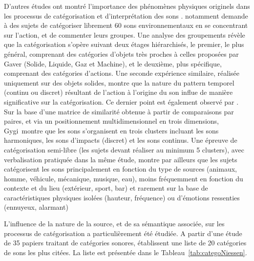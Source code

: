 D'autres études ont montré l'importance des phénomènes physiques originels dans les processus de catégorisation et d'interprétation des sons \citep{marcell2000confrontation,lemaitre2010listener}. \citep{houix_lexical_2012} notamment demande à des sujets de catégoriser librement 60 sons environnementaux en se concentrant sur l'action, et de commenter leurs groupes. Une analyse des groupements révèle que la catégorisation s'opère suivant deux étages hiérarchisés, le premier, le plus général, comprenant des catégories d'objets très proches à celles proposées par Gaver (Solide, Liquide, Gaz et Machine), et le deuxième, plus spécifique, comprenant des catégories d'actions. Une seconde expérience similaire, réalisée uniquement sur des objets solides, montre que la nature du pattern temporel (continu ou discret) résultant de l'action à l'origine du son influe de manière significative sur la catégorisation. Ce dernier point est également observé par \citep{gygi2007similarity}. Sur la base d'une matrice de similarité obtenue à partir de comparaisons par paires, et via un positionnement multidimensionnel en trois dimensions, Gygi~\al montre que les sons s'organisent en trois clusters incluant les sons harmoniques, les sons d'impacts (discret) et les sons continus. Une épreuve de catégorisation semi-libre  (les sujets devant réaliser au minimum 5 clusters), avec verbalisation pratiquée dans la même étude, montre par ailleurs que les sujets catégorisent les sons principalement en fonction du type de sources (animaux, homme, véhicule, mécanique, musique, eau), moins fréquemment en fonction du contexte et du lieu (extérieur, sport, bar) et rarement sur la base de caractéristiques physiques isolées (hauteur, fréquence) ou d'émotions ressenties (ennuyeux, alarmant)

L'influence de la nature de la source, et de sa sémantique associée, sur les processus de catégorisation a particulièrement été étudiée. A partir d'une étude de 35 papiers traitant de catégories sonores, \citep{niessen2010categories} établissent une liste de 20 catégories de sons les plus citées. La liste est présentée dans le Tableau~\ref{tab:categoNiessen}.

